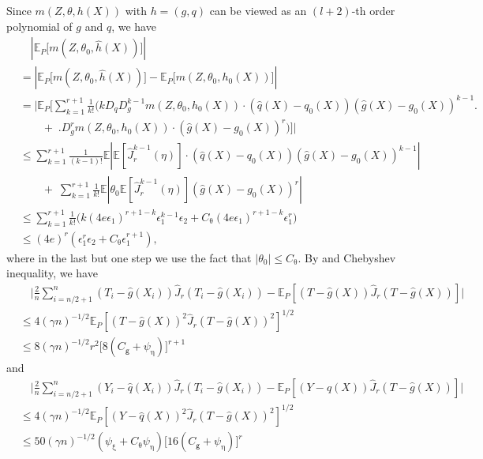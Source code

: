 \documentclass{article}
\def\eps{{\epsilon}}
\newcommand{\E}{\mathbb{E}}
\begin{document}
Since $m(Z,\theta,h(X))$ with $h=(g,q)$ can be viewed as an $(l+2)$-th order polynomial of $g$ and $q$, we have
\begin{equation}
    \label{eq:moment-higher-order-taylor}
    \begin{aligned}
        &\quad \left|\E_{P} \big[ m(Z,\theta_0, \hat{h}(X)) \big]\right| \\
        &= \left|\E_{P} \big[ m(Z,\theta_0, \hat{h}(X)) \big] - \E_{P} \big[ m(Z,\theta_0, h_0(X)) \big]\right| \\
        &= \bigg|\E_{P}\bigg[ \sum_{k=1}^{r+1} \frac{1}{k!} \Big(kD_qD_g^{k-1}m(Z,\theta_0,h_0(X))\cdot (\hat{q}(X)-q_0(X))(\hat{g}(X)-g_0(X))^{k-1} \bigg. \\
        &\qquad +\; \bigg. D_g^{r}m(Z,\theta_0,h_0(X))\cdot (\hat{g}(X)-g_0(X))^{r}  \Big) \bigg]\bigg| \\
        &\leq \sum_{k=1}^{r+1} \frac{1}{(k-1)!} \E\left|\E\left[\hat{J}_r^{k-1}(\eta)\right]\cdot (\hat{q}(X)-q_0(X))(\hat{g}(X)-g_0(X))^{k-1}\right| \\
        &\qquad +\; \sum_{k=1}^{r+1} \frac{1}{k!} \E\left|\theta_0\E\left[\hat{J}_r^{k-1}(\eta)\right] (\hat{g}(X)-g_0(X))^{r}\right| \\
        &\leq \sum_{k=1}^{r+1} \frac{1}{k!}\Big( k (4e\eps_1)^{r+1-k} \eps_1^{k-1}\eps_2 + C_{\uptheta} (4e\eps_1)^{r+1-k} \eps_1^r \Big) \\
        &\leq (4e)^{r} \left(\eps_1^{r}\eps_2 + C_{\uptheta}\eps_1^{r+1}\right),
    \end{aligned}
\end{equation}
where in the last but one step we use the fact that $|\theta_0|\leq C_{\uptheta}$.
By  and Chebyshev inequality, we have
\begin{equation}
    \label{eq:moment-concentration-1}
    \begin{aligned}
        &\quad \bigg|\frac{2}{n} \sum_{i=n/2+1}^{n} (T_i-\hat{g}(X_i))\hat{J}_r(T_i-\hat{g}(X_i)) - \E_{P}\left[ (T-\hat{g}(X))\hat{J}_r(T-\hat{g}(X)) \right]\bigg| \\
        &\leq 4(\gamma n)^{-1/2}\E_{P}\left[ (T-\hat{g}(X))^2\hat{J}_r(T-\hat{g}(X))^2 \right]^{1/2} \\
        &\leq 8(\gamma n)^{-1/2}r^2 \big[8(C_{\mathsf{g}}+\psi_{\upeta})\big]^{r+1}
    \end{aligned}
\end{equation}
and
\begin{equation}
    \label{eq:moment-concentration-2}
    \begin{aligned}
        &\quad \bigg|\frac{2}{n} \sum_{i=n/2+1}^{n} (Y_i-\hat{q}(X_i))\hat{J}_r(T_i-\hat{g}(X_i)) - \E_{P}\left[ (Y-\hat{q}(X))\hat{J}_r(T-\hat{g}(X)) \right]\bigg| \\
        &\leq 4(\gamma n)^{-1/2} \E_P\left[ (Y-\hat{q}(X))^2\hat{J}_r(T-\hat{g}(X))^2 \right]^{1/2} \\
        &\leq 50(\gamma n)^{-1/2}(\psi_{\upxi}+C_{\uptheta}\psi_{\upeta})\big[16(C_{\mathsf{g}}+\psi_{\upeta})\big]^{r}
    \end{aligned}
\end{equation}
\end{document}
